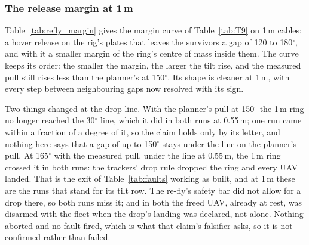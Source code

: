 \subsubsection{The release margin at \texorpdfstring{1\,m}{1 m}}

Table~\ref{tab:refly_margin} gives the margin curve of Table~\ref{tab:T9} on 1\,m cables: a hover release on the
rig's plates that leaves the survivors a gap of 120 to 180$^\circ$, and with it a smaller margin of the ring's centre
of mass inside them. The curve keeps its order: the smaller the margin, the larger the tilt rise, and the measured pull
still rises less than the planner's at 150$^\circ$. Its shape is cleaner at 1\,m, with every step between neighbouring
gaps now resolved with its sign.

Two things changed at the drop line. With the planner's pull at 150$^\circ$ the 1\,m ring no longer reached the
30$^\circ$ line, which it did in both runs at 0.55\,m; one run came within a fraction of a degree of it, so the claim
holds only by its letter, and nothing here says that a gap of up to 150$^\circ$ stays under the line on the planner's
pull. At 165$^\circ$ with the measured pull, under the line at 0.55\,m, the 1\,m ring crossed it in both runs: the
trackers' drop rule dropped the ring and every UAV landed. That is the exit of Table~\ref{tab:faults} working as
built, and at 1\,m these are the runs that stand for its tilt row. The re-fly's safety bar did not allow for a drop
there, so both runs miss it; and in both the freed UAV, already at rest, was disarmed with the fleet when the drop's
landing was declared, not alone. Nothing aborted and no fault fired, which is what that claim's falsifier asks, so it
is not confirmed rather than failed.

